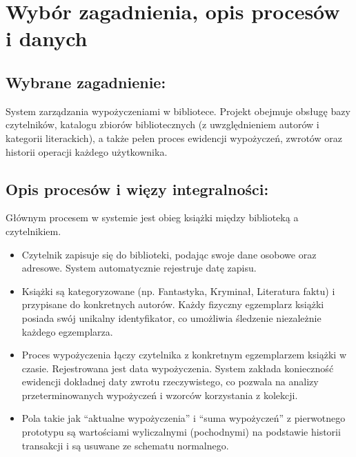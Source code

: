 \documentclass[letterpaper,10pt,english]{sphinxmanual}
\begin{document}
\section{Wybór zagadnienia, opis procesów i danych}
\label{\detokenize{rozdzial_3/index:wybor-zagadnienia-opis-procesow-i-danych}}

\subsection{Wybrane zagadnienie:}
\label{\detokenize{rozdzial_3/index:wybrane-zagadnienie}}
\sphinxAtStartPar
System zarządzania wypożyczeniami w bibliotece.
Projekt obejmuje obsługę bazy czytelników, katalogu zbiorów bibliotecznych (z uwzględnieniem autorów i kategorii literackich), a także pełen proces ewidencji wypożyczeń, zwrotów oraz historii operacji każdego użytkownika.


\subsection{Opis procesów i więzy integralności:}
\label{\detokenize{rozdzial_3/index:opis-procesow-i-wiezy-integralnosci}}
\sphinxAtStartPar
Głównym procesem w systemie jest obieg książki między biblioteką a czytelnikiem.
\begin{itemize}
\item {} 
\sphinxAtStartPar
{} Czytelnik zapisuje się do biblioteki, podając swoje dane osobowe oraz adresowe. System automatycznie rejestruje datę zapisu.

\item {} 
\sphinxAtStartPar
{} Książki są kategoryzowane (np. Fantastyka, Kryminał, Literatura faktu) i przypisane do konkretnych autorów. Każdy fizyczny egzemplarz książki posiada swój unikalny identyfikator, co umożliwia śledzenie niezależnie każdego egzemplarza.

\item {} 
\sphinxAtStartPar
{} Proces wypożyczenia łączy czytelnika z konkretnym egzemplarzem książki w czasie. Rejestrowana jest data wypożyczenia. System zakłada konieczność ewidencji dokładnej daty zwrotu rzeczywistego, co pozwala na analizy przeterminowanych wypożyczeń i wzorców korzystania z kolekcji.

\item {} 
\sphinxAtStartPar
{} Pola takie jak “aktualne wypożyczenia” i “suma wypożyczeń” z pierwotnego prototypu są wartościami wyliczalnymi (pochodnymi) na podstawie historii transakcji i są usuwane ze schematu normalnego.

\end{itemize}
\end{document}
